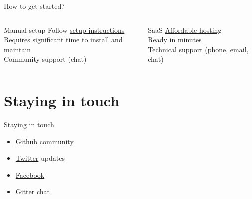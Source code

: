 \documentclass{beamer}
\begin{document}
\begin{frame}{How to get started?}
    \begin{columns}[T]
        \begin{column}{.45\textwidth}
            \begin{block}{Manual setup}
            Follow \href{https://reconmap.org/admin-manual/}{setup instructions}\\
			\bigskip
            Requires significant time to install and maintain\\
            Community support (chat)
            \end{block}
        \end{column}
        \begin{column}{.45\textwidth}
            \begin{block}{SaaS}
            \href{https://reconmap.com}{Affordable hosting}\\
            \bigskip
            Ready in minutes\\
            Technical support (phone, email, chat)
            \end{block}
        \end{column}
    \end{columns}
    
\end{frame}

\section{Staying in touch}

\begin{frame}{Staying in touch}
    \begin{itemize}
        \item \href{https://github.com/reconmap}{Github} community
        \item \href{https://twitter.com/reconmap}{Twitter} updates
        \item \href{https://facebook.com/reconmap}{Facebook}
        \item \href{https://gitter.im/reconmap/community}{Gitter} chat
    \end{itemize}
\end{frame}
\end{document}
